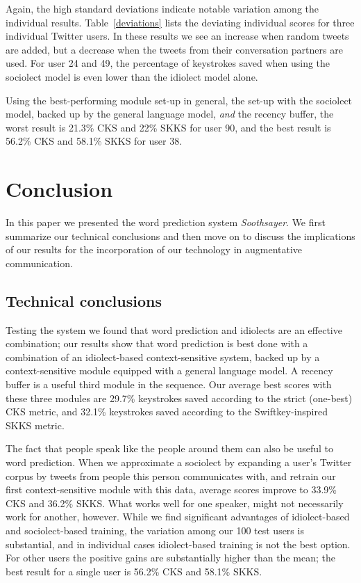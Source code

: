 \documentclass[12pt]{article}
\begin{document}
{Again, the high standard deviations indicate notable variation among the individual results. Table~\ref{deviations} lists the deviating individual scores for three individual Twitter users. In these results we see an increase when random tweets are added, but a decrease when the tweets from their conversation partners are used. For user 24 and 49, the percentage of keystrokes saved when using the sociolect model is even lower than the idiolect model alone.  

Using the best-performing module set-up in general, the set-up with the sociolect model, backed up by the general language model, \emph{and} the recency buffer, the worst result is 21.3\% CKS and 22\% SKKS for user 90, and the best result is 56.2\% CKS and 58.1\% SKKS for user 38.

\section{Conclusion} \label{conclusion}

In this paper we presented the word prediction system \emph{Soothsayer}. We first summarize our technical conclusions and then move on to discuss the implications of our results for the incorporation of our technology in augmentative communication.

\subsection{Technical conclusions}

Testing the system we found that word prediction and idiolects are an effective combination; our results show that word prediction is best done with a combination of an idiolect-based context-sensitive system, backed up by a context-sensitive module equipped with a general language model. A recency buffer is a useful third module in the sequence. Our average best scores with these three modules are 29.7\% keystrokes saved according to the strict (one-best) CKS metric, and 32.1\% keystrokes saved according to the Swiftkey-inspired SKKS metric. 

The fact that people speak like the people around them can also be useful to word prediction. When we approximate a sociolect by expanding a user's Twitter corpus by tweets from people this person communicates with, and retrain our first context-sensitive module with this data, average scores improve to 33.9\% CKS and 36.2\% SKKS. What works well for one speaker, might not necessarily work for another, however. While we find significant advantages of idiolect-based and sociolect-based training, the variation among our 100 test users is substantial, and in individual cases idiolect-based training is not the best option. For other users the positive gains are substantially higher than the mean; the best result for a single user is 56.2\% CKS and 58.1\% SKKS.

}
\end{document}
